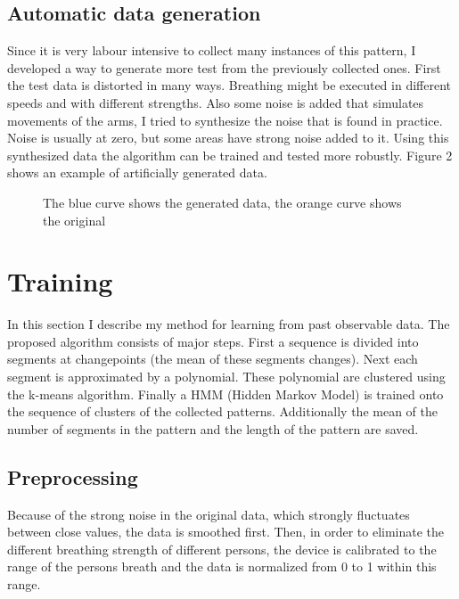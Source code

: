 \documentclass{article}
\begin{document}
\subsection{Automatic data generation}
Since it is very labour intensive to collect many instances of this pattern, I developed a way to generate more test from the previously collected ones. First the test data is distorted in many ways. Breathing might be executed in different speeds and with different strengths. Also some noise is added that simulates movements of the arms, I tried to synthesize the noise that is found in practice. Noise is usually at zero, but some areas have strong noise added to it. Using this synthesized data the algorithm can be trained and tested more robustly. Figure 2 shows an example of artificially generated data.\\
\begin{figure}[h]
  \centering
  \caption{The blue curve shows the generated data, the orange curve shows the original}
\end{figure}
\section{Training}
\label{method}
In this section I describe my method for learning from past observable data. The proposed algorithm consists of major steps. First a sequence is divided into segments at changepoints (the mean of these segments changes). Next each segment is approximated by a polynomial. These polynomial are clustered using the k-means algorithm. Finally a HMM (Hidden Markov Model) is trained onto the sequence of clusters of the collected patterns. Additionally the mean of the number of segments in the pattern and the length of the pattern are saved.
\subsection{Preprocessing}
Because of the strong noise in the original data, which strongly fluctuates between close values, the data is smoothed first. Then, in order to eliminate the different breathing strength of different persons, the device is calibrated to the range of the persons breath and the data is normalized from 0 to 1 within this range.
\end{document}
